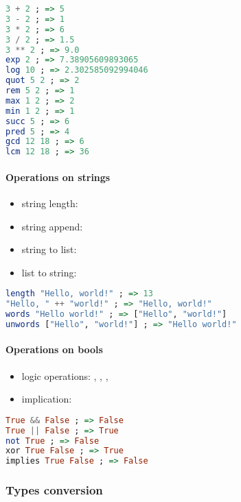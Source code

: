 \documentclass[a4paper,landscape,10pt]{article}
\begin{document}
\begin{multicols*}{2}
  \begin{lstlisting}[language=Haskell]
3 + 2 ; => 5
3 - 2 ; => 1
3 * 2 ; => 6
3 / 2 ; => 1.5
3 ** 2 ; => 9.0
exp 2 ; => 7.38905609893065
log 10 ; => 2.302585092994046
quot 5 2 ; => 2
rem 5 2 ; => 1
max 1 2 ; => 2
min 1 2 ; => 1
succ 5 ; => 6
pred 5 ; => 4
gcd 12 18 ; => 6
lcm 12 18 ; => 36
\end{lstlisting}

  \paragraph{Operations on strings}

  \begin{itemize}
    \item string length: 
    \item string append: \ihaskell{++}
    \item string to list: 
    \item list to string: 
  \end{itemize}

  \begin{lstlisting}[language=Haskell]
length "Hello, world!" ; => 13
"Hello, " ++ "world!" ; => "Hello, world!"
words "Hello world!" ; => ["Hello", "world!"]
unwords ["Hello", "world!"] ; => "Hello world!"
\end{lstlisting}

  \breakcolumn

  \paragraph{Operations on bools}

  \begin{itemize}
    \item logic operations: \ihaskell{&&}, \ihaskell{||}, , 
    \item implication: 
  \end{itemize}

  \begin{lstlisting}[language=Haskell]
True && False ; => False
True || False ; => True
not True ; => False
xor True False ; => True
implies True False ; => False
\end{lstlisting}

  \subsubsection{Types conversion}


\end{multicols*}
\end{document}
